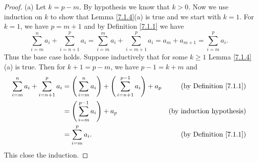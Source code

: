 \begin{proof}{(a)}
    Let \(k = p - m\).
    By hypothesis we know that \(k > 0\).
    Now we use induction on \(k\) to show that Lemma \ref{7.1.4}(a) is true and we start with \(k = 1\).
    For \(k = 1\), we have \(p = m + 1\) and by Definition \ref{7.1.1} we have
    \[
        \sum_{i = m}^n a_i + \sum_{i = n + 1}^p a_i = \sum_{i = m}^m a_i + \sum_{i = m + 1}^p a_i = a_m + a_{m + 1} = \sum_{i = m}^p a_i.
    \]
    Thus the base case holds.
    Suppose inductively that for some \(k \geq 1\) Lemma \ref{7.1.4}(a) is true.
    Then for \(k + 1 = p - m\), we have \(p - 1 = k + m\) and
    \begin{align*}
        \sum_{i = m}^n a_i + \sum_{i = n + 1}^p a_i & = \Bigg(\sum_{i = m}^n a_i\Bigg) + \Bigg(\sum_{i = n + 1}^{p - 1} a_i\Bigg) + a_p & \text{(by Definition \ref{7.1.1})} \\
                                                    & = \Bigg(\sum_{i = m}^{p - 1} a_i\Bigg) + a_p                                      & \text{(by induction hypothesis)}   \\
                                                    & = \sum_{i = m}^p a_i.                                                             & \text{(by Definition \ref{7.1.1})}
    \end{align*}
    This close the induction.
\end{proof}

